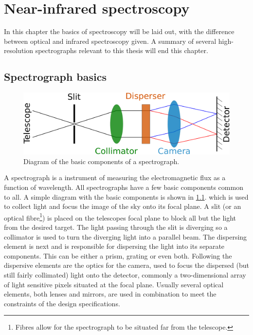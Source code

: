 
\chapter{Near-infrared spectroscopy}
\label{cha:nir_spectroscopy}
In this chapter the basics of spectroscopy will be laid out, with the difference between optical and infrared spectroscopy given.
A summary of several high-resolution \nir{} spectrographs relevant to this thesis will end this chapter.

\section{Spectrograph basics}
\label{sec:spectroscopy_basics}
\begin{figure}
    \centering
    \includegraphics[width=0.7\linewidth]{figures/spectroscopy/spectrograph_elements}
    \caption[Basic components of a spectrograph.]{Diagram of the basic components of a spectrograph.}
    \label{fig:spectrograph_elements}
\end{figure}
A spectrograph is a instrument of measuring the electromagnetic flux as a function of wavelength.
All spectrographs have a few basic components common to all.
A simple diagram with the basic components is shown in \cref{fig:spectrograph_elements}.
 which is used to collect light and focus the image of the sky onto its focal plane.
A slit (or an optical fibre\footnote{Fibres allow for the spectrograph to be situated far from the telescope.}) is placed on the telescopes focal plane to block all but the light from the desired target.
The light passing through the slit is diverging so a collimator is used to turn the diverging light into a parallel beam.
The dispersing element is next and is responsible for dispersing the light into its separate components.
This can be either a prism, grating or even both.
Following the dispersive elements are the optics for the camera, used to focus the dispersed (but still fairly collimated) light onto the detector, commonly a two-dimensional array of light sensitive pixels situated at the focal plane.
Usually several optical elements, both lenses and mirrors, are used in combination to meet the constraints of the design specifications.

